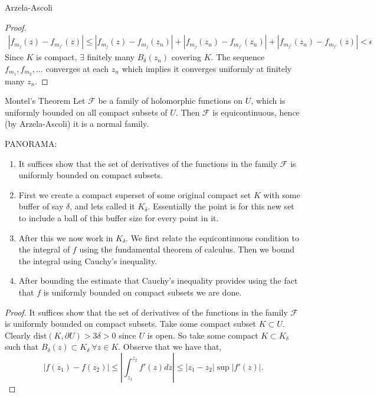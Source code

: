 \documentclass{article}
\begin{document}
\begin{thrm}{Arzela-Ascoli}{}
\begin{proof}
\begin{align*}
    \left\lvert f_{m_{j} }(z) - f _{m_{j'}}(z) \right\rvert \leq \left\lvert f_{m_{j} }(z) - f_{m_{j} }(z_{n} )   \right\rvert + \left\lvert f_{m_{j} }(z_{n} ) - f_{m_{j'} }(z_{n} )   \right\rvert +  \left\lvert f_{m_{j'} }(z_{n} ) - f_{m_{j'} }(z )   \right\rvert < \epsilon  
\end{align*}
Since \( K \) is compact, \( \exists  \) finitely many \( B_\delta (z_{n} ) \) covering \( K \). The sequence \( f_{m_1}, f_{m_2}, \dots    \) converges at each \( z_{n}  \) which implies it converges uniformly at finitely many \( z_{n}  \). 
\end{proof}

\end{thrm}

\begin{thrm}{Montel's Theorem}{}
Let \( \mathcal{F}  \) be a family of holomorphic functions on \( U \), which is uniformly bounded on all compact subsets of \( U \). Then \( \mathcal{F}  \) is equicontinuous, hence (by Arzela-Ascoli) it is a normal family. 

\tcbline 

PANORAMA:
\begin{enumerate}[]
    \item It suffices show that the set of derivatives of the functions in the family \( \mathcal{F}  \) is uniformly bounded on compact subsets. 
    \item First we create a compact superset of some original compact set \( K \) with some buffer of say \( \delta  \), and lets called it \( K_\delta  \). Essentially the point is for this new set to include a ball of this buffer size for every point in it. 
    \item After this we now work in \( K_\delta  \). We first relate the equicontinuous condition to the integral of \( f \) using the fundamental theorem of calculus. Then we bound the integral using Cauchy's inequality.
    \item After bounding the estimate that Cauchy's inequality provides using the fact that \( f \) is uniformly bounded on compact subsets we are done. 
\end{enumerate}

\quad 

\begin{proof}
    It suffices show that the set of derivatives of the functions in the family \( \mathcal{F}  \) is uniformly bounded on compact subsets. Take some compact subset \( K \subset U \). Clearly \( \mathrm{dist}(K, \partial U) > 3\delta > 0  \) since \( U \) is open. So take some compact \( K \subset K_\delta  \)  such that \( B_\delta (z) \subset K_\delta \ \forall z \in K\).  
    Observe that we have that,
    \[
        |f(z_1) - f(z_2)| \leq \left\lvert \int _{z_1}^{z_2} f'(z) dz\right\rvert \leq |z_{1}- z_2 |\sup \left\lvert f'(z) \right\rvert .
    \]


\end{proof}
\end{thrm}
\end{document}
